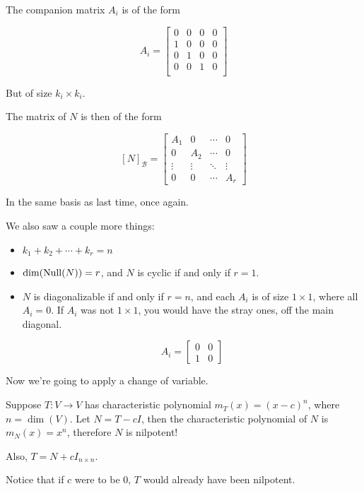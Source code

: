 \documentclass[12pt]{article}
\def\B{\mathcal B}
\begin{document}
  The companion matrix $A_i$ is of the form

  \[
    A_i = \begin{bmatrix}
      0 & 0 & 0 & 0 \\
      1 & 0 & 0 & 0 \\
      0 & 1 & 0 & 0 \\
      0 & 0 & 1 & 0 \\
    \end{bmatrix}
  \]

  But of size $k_i \times k_i$.

  The matrix of $N$ is then of the form

  \[
    [N]_\B = \begin{bmatrix}
      A_1 & 0 & \cdots & 0 \\
      0 & A_2 & \cdots & 0 \\
      \vdots & \vdots & \ddots & \vdots \\
      0 & 0 & \cdots & A_r
    \end{bmatrix}
  \]

  In the same basis as last time, once again.

  We also saw a couple more things:

  \begin{itemize}
    \item $k_1 + k_2 + \cdots + k_r = n$
    \item $\dim(\mathrm{Null}(N)) = r$, and $N$ is cyclic if and only if $r = 1$.
    \item $N$ is diagonalizable if and only if $r = n$, and each $A_i$ is of
      size $1 \times 1$, where all $A_i = 0$. If $A_i$ was not $1 \times 1$, you
      would have the stray ones, off the main diagonal.

      \[
        A_i = \begin{bmatrix}
          0 & 0 \\
          1 & 0
        \end{bmatrix}
      \]
  \end{itemize}

  Now we're going to apply a change of variable.

  Suppose $T: V \to V$ has characteristic polynomial $m_T(x) = (x - c)^n$, where
  $n = \dim(V)$. Let $N = T - cI$, then the characteristic polynomial of $N$ is
  $m_N(x) = x^n$, therefore $N$ is nilpotent!

  Also, $T = N + cI_{n \times n}$.

  Notice that if $c$ were to be 0, $T$ would already have been nilpotent.
\end{document}
